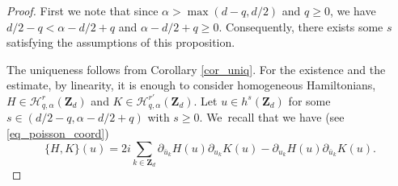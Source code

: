 \documentclass[JEP,XML,SOM,Unicode,NoEqCountersInSection,published]{cedram}
\theoremstyle{definition}
\begin{document}
\begin{proof} First we note that since $\alpha>\max(d-q,d/2)$ and $q\geq 0$, we have $d/2-q < \alpha-d/2+q$ and $\alpha-d/2+q \geq 0$. Consequently, there exists some $s$ satisfying the assumptions of this proposition.

The uniqueness follows from Corollary \ref{cor_uniq}. For the existence and the estimate, by linearity, it is enough to consider homogeneous Hamiltonians, $H\in \mathscr{H}_{q,\alpha}^r(\mathbf{Z}_d)$ and $K\in \mathscr{H}_{q,\alpha}^{r'}(\mathbf{Z}_d)$. Let $u\in h^s(\mathbf{Z}_d)$ for some $s\in (d/2-q, \alpha-d/2+q)$ with $s\geq 0$. We~recall that we have (see \eqref{eq_poisson_coord})
\begin{equation}
\label{eq_un_lapin}
\{ H,K\}(u) =
2i \sum_{k\in \mathbf{Z}_d} \partial_{\bar{u}_k}H(u) \partial_{u_k} K(u) - \partial_{u_k}H(u) \partial_{\bar{u}_k} K(u).
\end{equation}


\end{proof}
\end{document}
